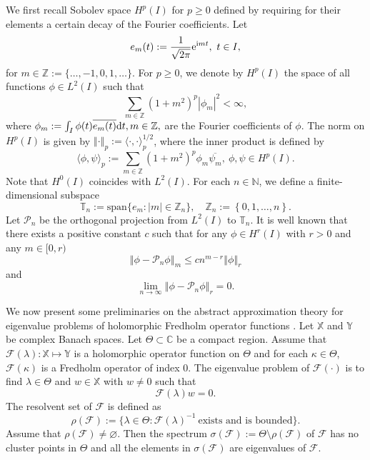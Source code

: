 \documentclass{article}
\newcommand{\abs}[1]{\left\vert#1\right\vert}
\newcommand{\norm}[1]{\left\Vert#1\right\Vert}
\newcommand{\set}[1]{\left\{#1\right\}}
\begin{document}
	We first recall Sobolev space $H^p(I)$ for $p\geq 0$ defined by requiring for their elements a certain decay of the Fourier coefficients.  Let
	\begin{equation}\label{Sec3:TriangularBasisFunctions}
		e_m(t):=\dfrac{1}{\sqrt{2\pi}}{\rm e}^{{\rm i}m t},~t\in I,
	\end{equation}
	for $m\in\mathbb{Z}:=\{\ldots,-1,0,1,\ldots\}$. For $p\geq0$, we denote by $H^p(I)$ the space of  all functions $\phi\in L^2(I)$ such that 
	\[
	\sum_{m\in\mathbb{Z}}(1+m^2)^p\abs{\phi_m}^2<\infty,
	\] 
	where $\phi_m:=\int_I\phi(t) \overline{e_m(t)}{\rm d}t, m\in\mathbb{Z},$ are the Fourier coefficients of $\phi$. The norm on $H^p(I)$ is given by $\norm{\cdot}_p:=\langle{\cdot,\cdot}\rangle_p^{1/2}$, where the inner product is defined by
	\begin{equation*}
		\langle{\phi,\psi}\rangle_p:=\sum_{m\in\mathbb{Z}}(1+m^2)^p\phi_m\overline{\psi_m},~\phi,\psi\in H^p(I).
	\end{equation*}
	Note that $H^0(I)$ coincides with $L^2(I)$.  For each $n\in\mathbb{N}$, we define a finite-dimensional subspace 
	\[
	\mathbb{T}_n:=\text{span}\{e_m:\abs{m}\in\mathbb{Z}_n\}, \quad \mathbb{Z}_n:=\set{0,1,\ldots,n}.
	\] Let $\mathcal{P}_n$ be the orthogonal projection from $L^2(I)$ to  $\mathbb{T}_n$. It is well known that there exists a positive constant $c$ such that for any $\phi\in H^r(I)$ with $r>0$ and any $m\in[0,r)$  \cite{kressBook1989}
	\begin{equation}\label{sec3:proj}
		\norm{\phi-\mathcal{P}_n\phi}_m\leq cn^{m-r}\norm{\phi}_r
	\end{equation}
	and
	\begin{equation}\label{sec3:proj0}
		\lim_{n\to\infty}\norm{\phi-\mathcal{P}_n\phi}_r=0.
	\end{equation}
	
	
	We now present some preliminaries on the abstract approximation theory for eigenvalue problems of holomorphic Fredholm operator functions \cite{karma1996a, karma1996b}. Let $\mathbb{X}$ and $\mathbb{Y}$ be complex Banach spaces. Let $\Theta\subset\mathbb{C}$ be a compact region. Assume that  $\mathcal{F}(\lambda):\mathbb{X}\mapsto\mathbb{Y}$ is a holomorphic operator function on $\Theta$ and for each $\kappa \in \Theta$, $\mathcal{F}(\kappa)$ is a Fredholm operator of index 0. The eigenvalue problem of $\mathcal{F}(\cdot)$ is to find $\lambda\in \Theta $ and $w\in\mathbb{X}$ with $w\neq0$ such that
	\begin{equation*}
		\mathcal{F}(\lambda)w=0.
	\end{equation*}
	The resolvent set  of $\mathcal{F}$ is defined as
	\begin{equation*}
		\rho(\mathcal{F}):=\{\lambda\in\Theta: \mathcal{F}(\lambda)^{-1}~ \text{exists and is bounded}\}.
	\end{equation*}
	Assume that $\rho(\mathcal{F})\neq\varnothing$. Then the spectrum $\sigma(\mathcal{F}):=\Theta\setminus \rho(\mathcal{F})$ of $\mathcal{F}$ has no cluster points in $\Theta$ and all the elements in $\sigma(\mathcal{F})$ are eigenvalues of $\mathcal{F}$. 
	
\end{document}
